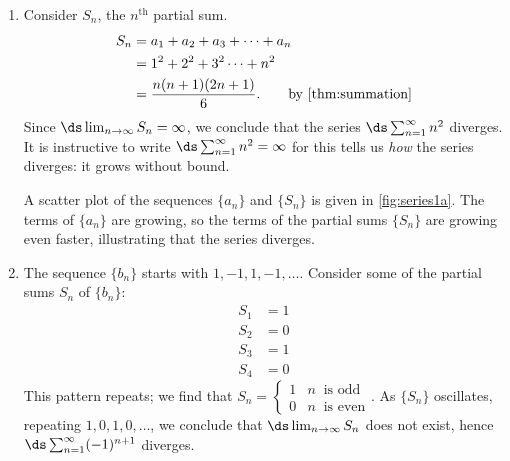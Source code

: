{\begin{enumerate}
\item	Consider $S_n$, the $n^\text{th}$ partial sum.
%
%
\begin{align*}
	S_n &= a_1+a_2+a_3+\dotsb+a_n \\		
	&= 1^2+2^2+3^2\dotsb+ n^2 \\
	&= \frac{n(n+1)(2n+1)}{6}. \qquad\text{by \autoref{thm:summation}}
\end{align*}
Since $\ds \lim_{n\to\infty}S_n = \infty$, we conclude that the series $\ds \sum_{n=1}^\infty n^2$ diverges. It is instructive to write $\ds \sum_{n=1}^\infty n^2=\infty$ for this tells us \emph{how} the series diverges: it grows without bound.

A scatter plot of the sequences $\{a_n\}$ and $\{S_n\}$ is given in \autoref{fig:series1a}. The terms of $\{a_n\}$ are growing, so the terms of the partial sums $\{S_n\}$ are growing even faster, illustrating that the series diverges.

\item	The sequence $\{b_n\}$ starts with $1, -1, 1, -1, \dotsc$. Consider some of the partial sums $S_n$ of $\{b_n\}$:
\begin{align*}
S_1 &= 1\\
S_2 &= 0\\
S_3 &= 1\\
S_4 &= 0
\end{align*}
This pattern repeats; we find that
$S_n = \begin{cases}
1  & n\ \text{ is odd}\\
0  & n\ \text{ is even}
\end{cases}$.
As $\{S_n\}$ oscillates, repeating $1, 0, 1, 0, \dotsc$, we conclude that $\ds\lim_{n\to\infty}S_n$ does not exist, hence $\ds\sum_{n=1}^\infty (-1)^{n+1}$ diverges.		


\end{enumerate}}
